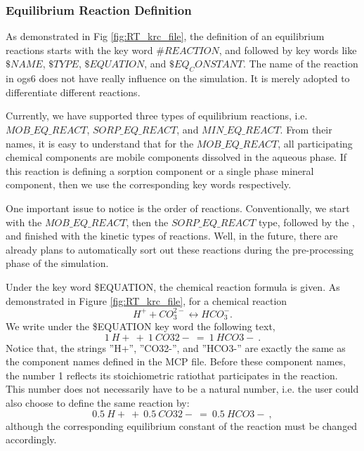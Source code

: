 \subsubsection{Equilibrium Reaction Definition}

As demonstrated in Fig \ref{fig:RT_krc_file}, the definition of an equilibrium reactions starts with the key word $\#REACTION$, and followed by key words like $\$NAME$, $\$TYPE$, $\$EQUATION$, and $\$EQ_CONSTANT$.  The name of the reaction in ogs6 does not have really influence on the simulation. It is merely adopted to differentiate different reactions. 

Currently, we have supported three types of equilibrium reactions, i.e. $MOB\_EQ\_REACT$, $SORP\_EQ\_REACT$, and $MIN\_EQ\_REACT$. From their names, it is easy to understand that for the $MOB\_EQ\_REACT$, all participating chemical components are mobile components dissolved in the aqueous phase. If this reaction is defining a sorption component or a single phase mineral component, then we use the corresponding key words respectively. 

One important issue to notice is the order of reactions. Conventionally, we start with the $MOB\_EQ\_REACT$, then the $SORP\_EQ\_REACT$ type, followed by the , and finished with the kinetic types of reactions. Well, in the future, there are already plans to automatically sort out these reactions during the pre-processing phase of the simulation. 

Under the key word \$EQUATION, the chemical reaction formula is given. As demonstrated in Figure \ref{fig:RT_krc_file}, for a chemical reaction 
$$ H^{+} + CO_3^{2-} \leftrightarrow HCO_3^{-} . $$
We write under the \$EQUATION key word the following text, 
$$ 1 ~ H+ ~ + ~ 1 ~ CO32- ~ = ~ 1 ~ HCO3- ~ . $$
Notice that, the strings ''H+'', ''CO32-'', and ''HCO3-'' are exactly the same as the component names defined in the MCP file. Before these component names, the number 1 reflects its stoichiometric ratiothat participates in the reaction. This number does not necessarily have to be a natural number, i.e. the user could also choose to define the same reaction by: 
$$ 0.5 ~ H+ ~ + ~ 0.5 ~ CO32- ~ = ~ 0.5 ~ HCO3- ~ , $$
although the corresponding equilibrium constant of the reaction must be changed accordingly. 

